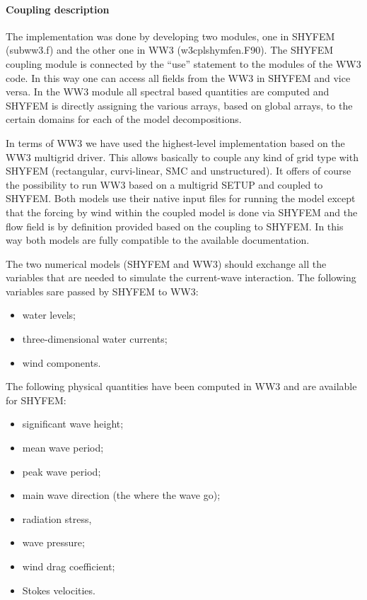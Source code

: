\paragraph{Coupling description}
The implementation was done by developing two modules, one in
SHYFEM (subww3.f) and the other one in WW3 (w3cplshymfen.F90). The 
SHYFEM coupling module is connected by the ``use'' statement to the 
modules of the WW3 code. In this way one can access all fields from 
the WW3 in SHYFEM and vice versa. In the WW3 module all spectral based
quantities are computed and SHYFEM is directly assigning the various 
arrays, based on global arrays, to the certain domains for each of the 
model decompositions.

In terms of WW3 we have used the highest-level implementation based
on the WW3 multigrid driver. This allows basically to couple any kind
of grid type with SHYFEM (rectangular, curvi-linear, SMC and
unstructured). It offers of course the possibility to run WW3 based
on a multigrid SETUP and coupled to SHYFEM. Both models use their
native input files for running the model except that the forcing by
wind within the coupled model is done via SHYFEM and the flow field
is by definition provided based on the coupling to SHYFEM. In this
way both models are fully compatible to the available documentation.

The two numerical models (SHYFEM and WW3) should exchange all the
variables that are needed to simulate the current-wave interaction.
The following variables sare passed by SHYFEM to WW3:
\begin{itemize}
\item water levels;
\item three-dimensional water currents;
\item wind components.
\end{itemize}

The following physical quantities have been computed in WW3 and are 
available for SHYFEM:
\begin{itemize}
\item significant wave height;
\item mean wave period;
\item peak wave period;
\item main wave direction (the where the wave go);
\item radiation stress,
\item wave pressure;
\item wind drag coefficient;
\item Stokes velocities.
\end{itemize}

